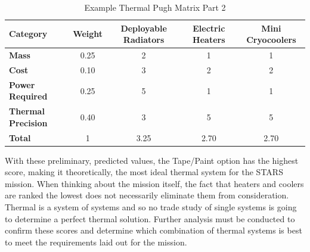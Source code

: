 \begin{table}[H]
\centering
\begin{tabular}{|l|c|c|c|c|} 
\hline
    \textbf{Category} & \textbf{Weight} & \textbf{Deployable Radiators} & \textbf{Electric Heaters} & \textbf{Mini Cryocoolers}
    \\
\hline
    \textbf{Mass} & 0.25 & 2 & 1 & 1
    \\
\hline
    \textbf{Cost} & 0.10 &  3 & 2 & 2
    \\
\hline
    \textbf{Power Required} & 0.25 & 5 & 1 & 1
    \\
\hline
    \textbf{Thermal Precision} & 0.40 & 3 & 5 & 5
    \\
\hline
    \textbf{Total} & 1 & 3.25 & 2.70 & 2.70
    \\
\hline
\end{tabular}
\caption{Example Thermal Pugh Matrix Part 2 }
\label{tbl:thermal_pugh2}
\end{table}
With these preliminary, predicted values, the Tape/Paint option has the highest score, making it theoretically, the most ideal thermal system for the STARS mission. When thinking about the mission itself, the fact that heaters and coolers are ranked the lowest does not necessarily eliminate them from consideration. Thermal is a system of systems and so no trade study of single systems is going to determine a perfect thermal solution. Further analysis must be conducted to confirm these scores and determine which combination of thermal systems is best to meet the requirements laid out for the mission. 

